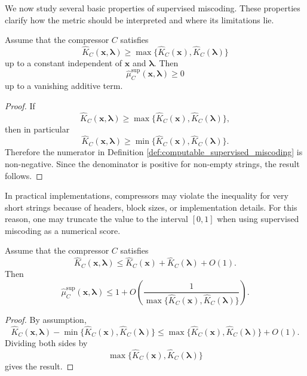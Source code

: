 We now study several basic properties of supervised miscoding. These properties clarify how the metric should be interpreted and where its limitations lie.

\begin{proposition}
\label{prop:supervised_miscoding_nonnegative}
Assume that the compressor \(C\) satisfies
\[
    \hat K_C(\mathbf{x},\boldsymbol{\lambda})
    \geq
    \max\{\hat K_C(\mathbf{x}),\hat K_C(\boldsymbol{\lambda})\}
\]
up to a constant independent of \(\mathbf{x}\) and \(\boldsymbol{\lambda}\). Then
\[
    \hat\mu_C^{\mathrm{sup}}(\mathbf{x},\boldsymbol{\lambda}) \geq 0
\]
up to a vanishing additive term.
\end{proposition}

\begin{proof}
If
\[
    \hat K_C(\mathbf{x},\boldsymbol{\lambda})
    \geq
    \max\{\hat K_C(\mathbf{x}),\hat K_C(\boldsymbol{\lambda})\},
\]
then in particular
\[
    \hat K_C(\mathbf{x},\boldsymbol{\lambda})
    \geq
    \min\{\hat K_C(\mathbf{x}),\hat K_C(\boldsymbol{\lambda})\}.
\]
Therefore the numerator in Definition \ref{def:computable_supervised_miscoding} is non-negative. Since the denominator is positive for non-empty strings, the result follows.
\end{proof}

In practical implementations, compressors may violate the inequality for very short strings because of headers, block sizes, or implementation details. For this reason, one may truncate the value to the interval \([0,1]\) when using supervised miscoding as a numerical score.

\begin{proposition}
\label{prop:supervised_miscoding_upper_bound}
Assume that the compressor \(C\) satisfies
\[
    \hat K_C(\mathbf{x},\boldsymbol{\lambda})
    \leq
    \hat K_C(\mathbf{x})+\hat K_C(\boldsymbol{\lambda})+O(1).
\]
Then
\[
    \hat\mu_C^{\mathrm{sup}}(\mathbf{x},\boldsymbol{\lambda})
    \leq
    1+O\left(
        \frac{1}
        {\max\{\hat K_C(\mathbf{x}),\hat K_C(\boldsymbol{\lambda})\}}
    \right).
\]
\end{proposition}

\begin{proof}
By assumption,
\[
    \hat K_C(\mathbf{x},\boldsymbol{\lambda})
    -
    \min\{\hat K_C(\mathbf{x}),\hat K_C(\boldsymbol{\lambda})\}
    \leq
    \max\{\hat K_C(\mathbf{x}),\hat K_C(\boldsymbol{\lambda})\}+O(1).
\]
Dividing both sides by
\[
    \max\{\hat K_C(\mathbf{x}),\hat K_C(\boldsymbol{\lambda})\}
\]
gives the result.
\end{proof}

